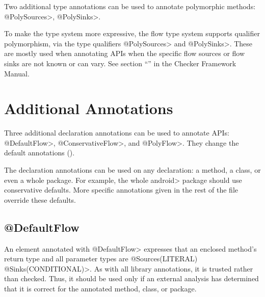 Two additional type annotations can be used to annotate polymorphic
methods: \<@PolySources>, \<@PolySinks>.

To make the type system more expressive, the flow type system supports
qualifier polymorphism, via the type qualifiers \<@PolySources> and
\<@PolySinks>.  These are mostly used when annotating APIs when the
specific flow sources or flow sinks are not known or can vary. 
See section ``'' in the Checker Framework Manual.  




\section{Additional Annotations\label{sec:addtionalanno}}

Three additional declaration annotations can be used to annotate APIs:
\<@DefaultFlow>, \<@ConservativeFlow>, and \<@PolyFlow>. 
They change the default annotations ().
 
The declaration annotations can be used on any declaration: a method,
a class, or even a whole package.
For example, the
whole \<android> package should use conservative defaults.
More specific annotations given in the rest of the file override these
defaults.


\subsection{@DefaultFlow}

An element annotated with \<@DefaultFlow> expresses that an enclosed
method's return type and all parameter types are \<@Sources(LITERAL)
@Sinks(CONDITIONAL)>.  As with all 
library annotations, it is trusted rather than checked.  Thus, it should be
used only if an external analysis has determined that it is correct for the
annotated method, class, or package.




